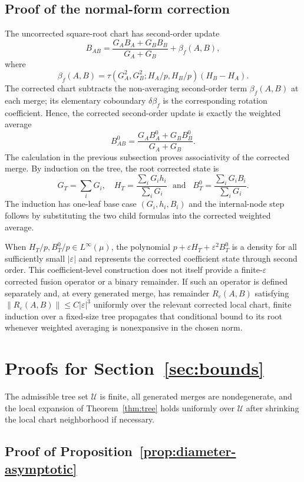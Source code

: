 \documentclass[11pt]{article}
\theoremstyle{plain}
\theoremstyle{definition}
\theoremstyle{definition}
\newcommand{\eps}{\varepsilon}
\begin{document}
\subsection{Proof of the normal-form correction}

The uncorrected square-root chart has second-order update
\[
B_{AB}=\frac{G_AB_A+G_BB_B}{G_A+G_B}+\beta_f(A,B),
\]
where
\[
\beta_f(A,B)=\tau(G_A^2,G_B^2;H_A/p,H_B/p)(H_B-H_A).
\]
The corrected chart subtracts the non-averaging second-order term $\beta_f(A,B)$ at each merge; its elementary coboundary $\delta\beta_f$ is the corresponding rotation coefficient. Hence, the corrected second-order update is exactly the weighted average
\[
B^0_{AB}=\frac{G_AB^0_A+G_BB^0_B}{G_A+G_B}.
\]
The calculation in the previous subsection proves associativity of the corrected merge. By induction on the tree, the root corrected state is
\[
G_T=\sum_iG_i,
\quad
H_T=\frac{\sum_iG_ih_i}{\sum_iG_i}
\,\,\,\,\text{and}\,\,\,\,\,
B_T^0=\frac{\sum_iG_iB_i}{\sum_iG_i}.
\]
The induction has one-leaf base case $(G_i,h_i,B_i)$ and the internal-node step follows by substituting the two child formulas into the corrected weighted average.

When $H_T/p,B_T^0/p\in L^\infty(\mu)$, the polynomial $p+\eps H_T+\eps^2B_T^0$ is a density for all sufficiently small $|\eps|$ and represents the corrected coefficient state through second order. This coefficient-level construction does not itself provide a finite-$\eps$ corrected fusion operator or a binary remainder. If such an operator is defined separately and, at every generated merge, has remainder $R_\eps(A,B)$ satisfying $\|R_\eps(A,B)\|\le C|\eps|^3$ uniformly over the relevant corrected local chart, finite induction over a fixed-size tree propagates that conditional bound to its root whenever weighted averaging is nonexpansive in the chosen norm.


\section{Proofs for Section~\ref{sec:bounds}}\label{app:bounds}
The admissible tree set $\mathcal U$ is finite, all generated merges are nondegenerate, and the local expansion of Theorem~\ref{thm:tree} holds uniformly over $\mathcal U$ after shrinking the local chart neighborhood if necessary.

\subsection{Proof of Proposition~\ref{prop:diameter-asymptotic}}
\end{document}
